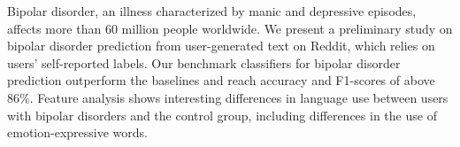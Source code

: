 Bipolar disorder, an illness characterized by manic and depressive episodes, affects more than 60 million people worldwide. We present a preliminary study on bipolar disorder prediction from user-generated text on Reddit, which relies on users' self-reported labels. Our benchmark classifiers for bipolar disorder prediction outperform the baselines and reach accuracy and F1-scores of above 86\%. Feature analysis shows interesting differences in language use between users with bipolar disorders and the control group, including differences in the use of emotion-expressive words.
